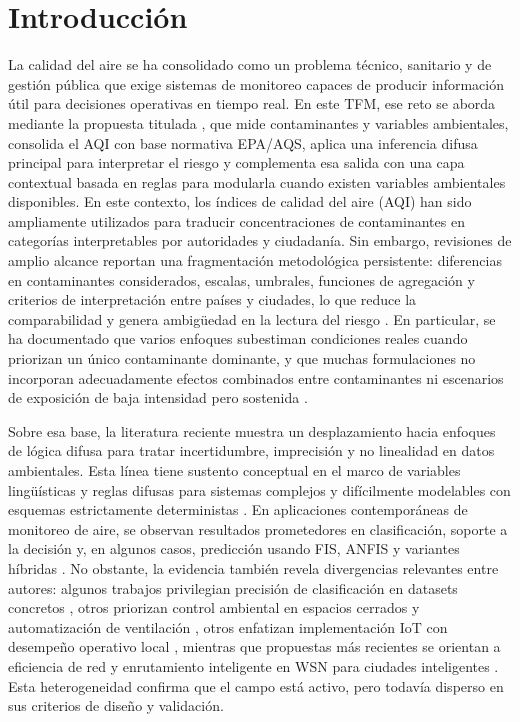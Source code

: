
\section{Introducción}

La calidad del aire se ha consolidado como un problema técnico, sanitario y de gestión pública que exige sistemas de monitoreo capaces de producir información útil para decisiones operativas en tiempo real. En este TFM, ese reto se aborda mediante la propuesta titulada \PortadaTitulo, que mide contaminantes y variables ambientales, consolida el AQI con base normativa EPA/AQS, aplica una inferencia difusa principal para interpretar el riesgo y complementa esa salida con una capa contextual basada en reglas para modularla cuando existen variables ambientales disponibles. En este contexto, los índices de calidad del aire (AQI) han sido ampliamente utilizados para traducir concentraciones de contaminantes en categorías interpretables por autoridades y ciudadanía. Sin embargo, revisiones de amplio alcance reportan una fragmentación metodológica persistente: diferencias en contaminantes considerados, escalas, umbrales, funciones de agregación y criterios de interpretación entre países y ciudades, lo que reduce la comparabilidad y genera ambigüedad en la lectura del riesgo \cite{ART01,ART02}. En particular, se ha documentado que varios enfoques subestiman condiciones reales cuando priorizan un único contaminante dominante, y que muchas formulaciones no incorporan adecuadamente efectos combinados entre contaminantes ni escenarios de exposición de baja intensidad pero sostenida \cite{ART01}.

Sobre esa base, la literatura reciente muestra un desplazamiento hacia enfoques de lógica difusa para tratar incertidumbre, imprecisión y no linealidad en datos ambientales. Esta línea tiene sustento conceptual en el marco de variables lingüísticas y reglas difusas para sistemas complejos y difícilmente modelables con esquemas estrictamente deterministas \cite{ART03}. En aplicaciones contemporáneas de monitoreo de aire, se observan resultados prometedores en clasificación, soporte a la decisión y, en algunos casos, predicción usando FIS, ANFIS y variantes híbridas \cite{ART04,ART05,ART06,ART07,ART08}. No obstante, la evidencia también revela divergencias relevantes entre autores: algunos trabajos privilegian precisión de clasificación en datasets concretos \cite{ART04}, otros priorizan control ambiental en espacios cerrados y automatización de ventilación \cite{ART05}, otros enfatizan implementación IoT con desempeño operativo local \cite{ART06,ART07}, mientras que propuestas más recientes se orientan a eficiencia de red y enrutamiento inteligente en WSN para ciudades inteligentes \cite{ART08}. Esta heterogeneidad confirma que el campo está activo, pero todavía disperso en sus criterios de diseño y validación.


